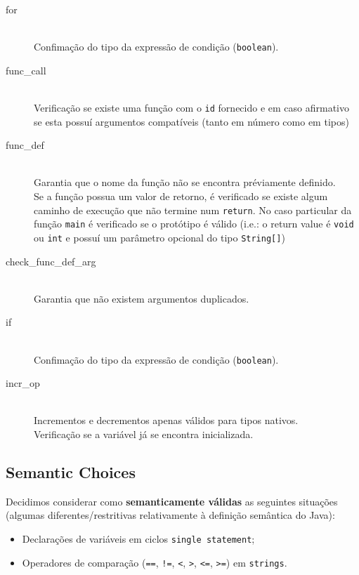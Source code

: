 \documentclass[a4paper]{article}
\begin{document}
\begin{description}
	\item [for] \hfill \\
		Confimação do tipo da expressão de condição (\texttt{boolean}).

	\item [func\_call] \hfill \\
		Verificação se existe uma função com o \texttt{id} fornecido e em caso afirmativo se esta possuí argumentos compatíveis
		(tanto em número como em tipos)
		
	\item [func\_def] \hfill \\
		Garantia que o nome da função não se encontra préviamente definido. \\
		Se a função possua um valor de retorno, é verificado se existe algum caminho de execução que não termine num \texttt{return}.
		No caso particular da função \texttt{main} é verificado se o protótipo é válido
		(i.e.: o return value é \texttt{void} ou \texttt{int} e possuí um parâmetro opcional do tipo \texttt{String[]})
		
	\item [check\_func\_def\_arg] \hfill \\
		Garantia que não existem argumentos duplicados.

	\item [if] \hfill \\
		Confimação do tipo da expressão de condição (\texttt{boolean}).

	\item [incr\_op] \hfill \\
		Incrementos e decrementos apenas válidos para tipos nativos. \\
		Verificação se a variável já se encontra inicializada.

\end{description}

\subsection{Semantic Choices}
\indent \indent Decidimos considerar como \textbf{semanticamente válidas} as seguintes situações (algumas diferentes/restritivas relativamente à definição semântica do Java):
\begin{itemize}
	\item Declarações de variáveis em ciclos \texttt{single statement};
	\item Operadores de comparação (\texttt{==}, \texttt{!=}, \texttt{<}, \texttt{>}, \texttt{<=}, \texttt{>=}) em \texttt{strings}.
\end{itemize}
\end{document}
